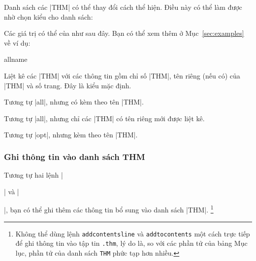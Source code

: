 \begin{theorem}
\begin{thm}
\begin{dinhly}
\begin{dinhly*}
\DescribeMacro\theoremlisttype
Danh sách các |THM| có thể thay đổi cách thể hiện.
Điều này có thể làm được nhờ chọn kiểu cho danh sách:
\begin{command}
\end{command}
Các giá trị có thể của  như sau đây. Bạn có thể
xem thêm ở Mục~\vref{sec:examples} về ví dụ:
\begin{deflist}{allname}
 \item[all]
	Liệt kê các |THM| với các thông tin gồm chỉ số |THM|,
	tên riêng (nếu có) của |THM| và số trang. Đây là kiểu mặc định.
 \item[allname]
	Tương tự |all|, nhưng có kèm theo tên |THM|.
 \item[opt]
	Tương tự |all|, nhưng chỉ các |THM| có tên riêng mới được liệt kê.
 \item[optname]
	Tương tự |opt|, nhưng kèm theo tên |THM|.
\end{deflist}

\subsubsection{\texorpdfstring{Ghi thông tin vào danh sách THM}{Ghi thong tin vao danh sach THM}}

Tương tự hai lệnh |\addcontentsline| và |\addtocontents|,
bạn có thể ghi thêm các thông tin bổ sung vào danh sách |THM|.%
\footnote{%
	Không thể dùng lệnh \texttt{\bslash addcontentsline} và \texttt{\bslash addtocontents}
	một cách trực tiếp để ghi thông tin vào tập tin \texttt{.thm},
	lý do là, so với các phần tử của bảng Mục lục, phần tử của danh sách \texttt{THM}
	phức tạp hơn nhiều.%
}


\end{dinhly*}
\end{dinhly}
\end{thm}
\end{theorem}
